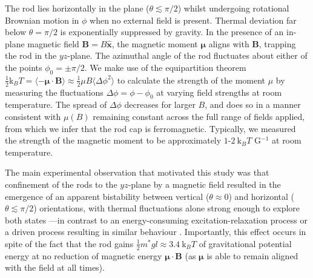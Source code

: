 \documentclass[aps,prl,reprint,twocolumn,superscriptaddress,showpacs]{revtex4-1}
\newcommand{\vcrm}[1]{\mathbf{#1}}
\newcommand{\hvcrm}[1]{\mathbf{\hat{#1}}}
\newcommand{\vc}[1]{\boldsymbol{#1}}
\newcommand{\kk}{\mathrm{k}_B}
\begin{document}
The rod lies horizontally in the plane ($\theta\lesssim\pi/2$) whilst undergoing rotational Brownian motion in $\phi$ when no external field is present. Thermal deviation far below $\theta=\pi/2$ is exponentially suppressed by gravity. In the presence of an in-plane magnetic field $\vcrm{B}=B \hvcrm{x}$, the magnetic moment $\vc{\mu}$ aligns with $\vcrm{B}$, trapping the rod in the $yz$-plane. The azimuthal angle of the rod fluctuates about either of the points $\phi_0=\pm\pi/2$. We make use of the equipartition theorem $ \frac{1}{2}\kk T = \langle -\vc{\mu}\cdot\vcrm{B}\rangle \approx \frac{1}{2}\mu B \langle \Delta\phi^2 \rangle $ to calculate the strength of the moment $\mu$ by measuring the fluctuations $\Delta\phi=\phi-\phi_0$ at varying field strengths at room temperature. The spread of $\Delta\phi$ decreases for larger $B$, and does so in a manner consistent with $\mu(B)$ remaining constant across the full range of fields applied, from which we infer that the rod cap is ferromagnetic. Typically, we measured the strength of the magnetic moment to be approximately $1$-$2\ \kk T $ G$^{-1}$ at room temperature.

The main experimental observation that motivated this study was that confinement of the rods to the $yz$-plane by a magnetic field resulted in the emergence of an apparent bistability between vertical ($\theta \approx 0$) and horizontal ($\theta \lesssim \pi/2$) orientations, with thermal fluctuations alone strong enough to explore both states ---in contrast to an energy-consuming excitation-relaxation process or a driven process resulting in similar behaviour \cite{Dhar2007}. Importantly, this effect occurs in spite of the fact that the rod gains $\frac{1}{2}m^* g l \approx 3.4 \ \kk T$ of gravitational potential energy at no reduction of magnetic energy $\vc{\mu}\cdot \vcrm{B}$ (as $\vc{\mu}$ is able to remain aligned with the field at all times).

\end{document}

